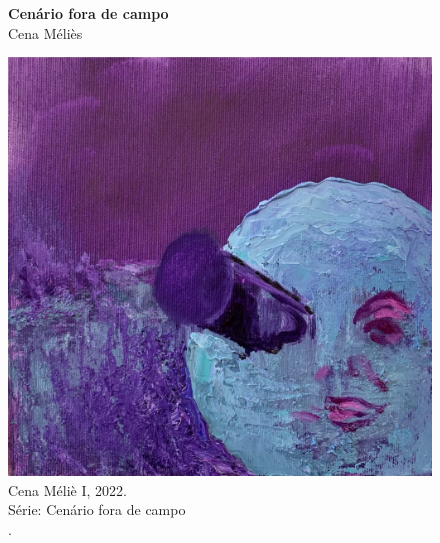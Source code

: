\begin{figure}
  \flushright
\begin{minipage}[l]{.4\linewidth}
  \caption[Cenário fora de campo: Cena Méliès]{\textbf{Cenário fora de campo} \\ Cena Méliès}
	\includegraphics[width = \linewidth]{apendice/pinturas-finalizadas/boudet-cena-melies-i.pdf}
  \caption*{Cena Méliè I, 2022. \\ Série: Cenário fora de campo \\ \oleolinho. \\ }
\end{minipage}
\end{figure}

\clearpage

%

